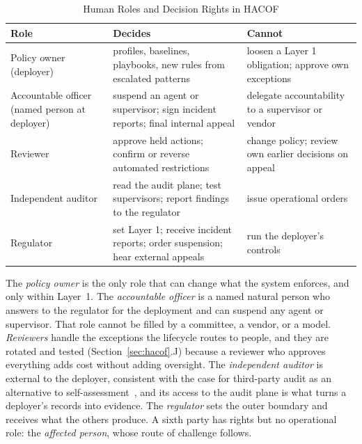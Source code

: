 \documentclass{ieeeaccess}
\newcommand{\hacof}{HACOF}
\begin{document}
\begin{table}[!t]
\caption{Human Roles and Decision Rights in \hacof}
\label{tab:roles}
\centering
\footnotesize
\setlength{\tabcolsep}{3pt}
\begin{tabular}{>{\raggedright\arraybackslash}p{1.55cm}>{\raggedright\arraybackslash}p{2.85cm}>{\raggedright\arraybackslash}p{2.75cm}}
\toprule
\rowcolor{darkblue!15}
\textbf{Role} & \textbf{Decides} & \textbf{Cannot} \\
\midrule
Policy owner (deployer) & profiles, baselines, playbooks, new rules from escalated patterns & loosen a Layer 1 obligation; approve own exceptions \\
\rowcolor{darkblue!5}
Accountable officer (named person at deployer) & suspend an agent or supervisor; sign incident reports; final internal appeal & delegate accountability to a supervisor or vendor \\
Reviewer & approve held actions; confirm or reverse automated restrictions & change policy; review own earlier decisions on appeal \\
\rowcolor{darkblue!5}
Independent auditor & read the audit plane; test supervisors; report findings to the regulator & issue operational orders \\
Regulator & set Layer 1; receive incident reports; order suspension; hear external appeals & run the deployer's controls \\
\bottomrule
\end{tabular}
\end{table}

The \textit{policy owner} is the only role that can change what the system enforces, and only within Layer~1. The \textit{accountable officer} is a named natural person who answers to the regulator for the deployment and can suspend any agent or supervisor. That role cannot be filled by a committee, a vendor, or a model. \textit{Reviewers} handle the exceptions the lifecycle routes to people, and they are rotated and tested (Section~\ref{sec:hacof}.J) because a reviewer who approves everything adds cost without adding oversight. The \textit{independent auditor} is external to the deployer, consistent with the case for third-party audit as an alternative to self-assessment~\cite{brundage2020trustworthy},
and its access to the audit plane is what turns a deployer's records into evidence. The \textit{regulator} sets the outer boundary and receives what the others produce. A sixth party has rights but no operational role: the \textit{affected person}, whose route of challenge follows.
\end{document}
